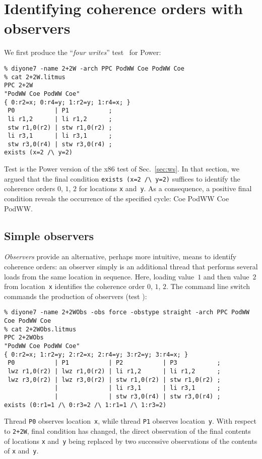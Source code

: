 \section{Identifying\label{observers} coherence orders with observers}
We first produce the ``\emph{four writes}'' test~
for Power:
\begin{verbatim}
% diyone7 -name 2+2W -arch PPC PodWW Coe PodWW Coe
% cat 2+2W.litmus
PPC 2+2W
"PodWW Coe PodWW Coe"
{ 0:r2=x; 0:r4=y; 1:r2=y; 1:r4=x; }
 P0           | P1           ;
 li r1,2      | li r1,2      ;
 stw r1,0(r2) | stw r1,0(r2) ;
 li r3,1      | li r3,1      ;
 stw r3,0(r4) | stw r3,0(r4) ;
exists (x=2 /\ y=2)
\end{verbatim}
Test  is the Power version of the x86 test
 of Sec.~\ref{sec:ws}.
In that section, we argued that the final condition \verb+exists (x=2 /\ y=2)+
suffices to identify the coherence orders $0$, $1$, $2$
for locations \texttt{x} and~\texttt{y}.
As a consequence, a positive final condition reveals the occurrence
of the specified cycle: Coe PodWW Coe PodWW.

\subsection{Simple observers}
\emph{Observers} provide an alternative, perhaps more intuitive,
means to identify coherence orders: an observer simply is an additional thread
that performs several loads from the same location in sequence.
Here, loading value~$1$ and then value~$2$ from location~\texttt{x}
identifies the coherence order  $0$, $1$, $2$.
The command line switch  commands the production
of observers (test ):
\begin{verbatim}
% diyone7 -name 2+2WObs -obs force -obstype straight -arch PPC PodWW Coe PodWW Coe
% cat 2+2WObs.litmus
PPC 2+2WObs
"PodWW Coe PodWW Coe"
{ 0:r2=x; 1:r2=y; 2:r2=x; 2:r4=y; 3:r2=y; 3:r4=x; }
 P0           | P1           | P2           | P3           ;
 lwz r1,0(r2) | lwz r1,0(r2) | li r1,2      | li r1,2      ;
 lwz r3,0(r2) | lwz r3,0(r2) | stw r1,0(r2) | stw r1,0(r2) ;
              |              | li r3,1      | li r3,1      ;
              |              | stw r3,0(r4) | stw r3,0(r4) ;
exists (0:r1=1 /\ 0:r3=2 /\ 1:r1=1 /\ 1:r3=2)
\end{verbatim}
Thread \texttt{P0} observes location~\texttt{x}, while
thread \texttt{P1} observes location~\texttt{y}.
With respect to \texttt{2+2W}, final condition has changed, the direct
observation of the final contents of locations \texttt{x} and~\texttt{y}
being replaced by two successive observations of the contents of
\texttt{x} and~\texttt{y}.

